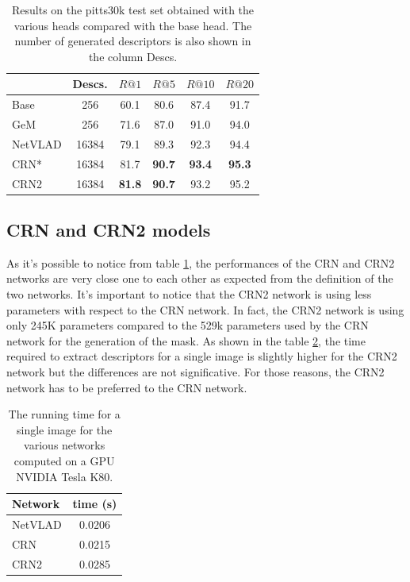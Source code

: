 \documentclass[10pt,twocolumn,letterpaper]{article}
\begin{document}
\begin{table}
   \centering
\begin{tabular}{|l|c|c|c|c|c|}
\hline
         & Descs.&        $R@1$   &        $R@5$   &        $R@10$  &        $R@20$   \\ \hline
Base     & 256   &         60.1   &         80.6   &          87.4   &          91.7   \\
GeM      & 256   &         71.6   &         87.0   &          91.0   &          94.0   \\
NetVLAD  & 16384 &         79.1   &         89.3   &          92.3   &          94.4   \\ \hline
CRN*     & 16384 &         81.7   & \textbf{90.7}  &  \textbf{93.4}  &  \textbf{95.3}  \\
CRN2     & 16384 &\textbf{81.8}   & \textbf{90.7}  &          93.2   &          95.2   \\ \hline
\end{tabular}
\caption{Results on the pitts30k test set obtained with the various heads compared with the base head. The number of generated descriptors 
is also shown in the column Descs.}
\label{tab:base_results}
\end{table}

\subsection{CRN and CRN2 models}
As it's possible to notice from table \ref{tab:base_results}, the performances of the CRN and CRN2 networks are very close one to each other as expected
from the definition of the two networks. It's important to notice that the CRN2 network is using less parameters with respect to the CRN network. In fact,
the CRN2 network is using only 245K parameters compared to the 529k parameters used by the CRN network for the generation of the mask.
As shown in the table \ref{tab:time}, the time required to extract descriptors for a single image is slightly higher for the CRN2 network but the differences
are not significative. For those reasons, the CRN2 network has to be preferred to the CRN network. 

\begin{table}
   \centering
   \begin{tabular}{|l|c|}
      \hline
      Network     &  time (s)\\\hline
      NetVLAD     &  0.0206\\
      CRN         &  0.0215\\
      CRN2        &  0.0285\\\hline
   \end{tabular}
   \caption{The running time for a single image for the various networks computed on a GPU NVIDIA Tesla K80.}
   \label{tab:time}
\end{table}
\end{document}
